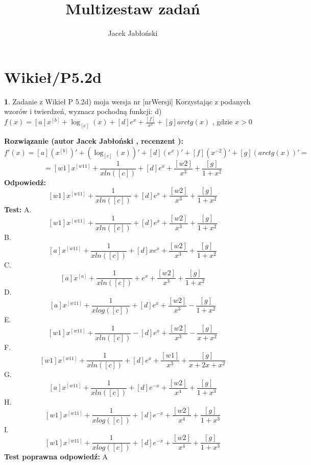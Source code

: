 \documentclass[12pt, a4paper]{article}
\title{Multizestaw zadań}
\author{Jacek Jabłoński}
\date{}
\theoremstyle{definition} %
\newtheorem{zad}{}
\newcommand{\kategoria}[1]{\section{#1}} %
\newcommand{\zadStart}[1]{\begin{zad}#1\newline} %
\newcommand{\zadStop}{\end{zad}}   %
\newcommand{\rozwStart}[2]{\noindent \textbf{Rozwiązanie (autor #1 , recenzent #2): }\newline} %
\newcommand{\rozwStop}{\newline}                                            %
\newcommand{\odpStart}{\noindent \textbf{Odpowiedź:}\newline}    %
\newcommand{\odpStop}{\newline}                                             %
\newcommand{\testStart}{\noindent \textbf{Test:}\newline} %
\newcommand{\testStop}{\newline} %
\newcommand{\kluczStart}{\noindent \textbf{Test poprawna odpowiedź:}\newline} %
\newcommand{\kluczStop}{\newline} %
\begin{document}
\maketitle


\kategoria{Wikieł/P5.2d}
\zadStart{Zadanie z Wikieł P 5.2d) moja wersja nr [nrWersji]}
Korzystając z podanych wzorów i twierdzeń, wyznacz pochodną funkcji:
d) $f(x)=[a]x^{[b]} + \log_{[c]}(x) + [d]e^x + \frac{[f]}{x^2} + [g]arctg(x)$ , gdzie $x>0$
\zadStop
\rozwStart{Jacek Jabłoński}{}
$$f'(x)=[a](x^{[b]})' + (\log_{[c]}(x))' + [d](e^x)' + [f](x^{-2})' + [g](arctg(x))' =$$
$$= [w1]x^{[w11]} + \frac{1}{x ln([c])} +[d] e^x + \frac{[w2]}{x^3} + \frac{[g]}{1+x^2}$$
\rozwStop
\odpStart
$$[w1]x^{[w11]} + \frac{1}{x ln([c])} +[d] e^x + \frac{[w2]}{x^3} + \frac{[g]}{1+x^2}$$
\odpStop
\testStart
A. $$[w1]x^{[w11]} + \frac{1}{x ln([c])} +[d] e^x + \frac{[w2]}{x^3} + \frac{[g]}{1+x^2}$$
B. $$[a]x^{[w11]} + \frac{1}{x ln([c])}+[d]x e^x + \frac{[w2]}{x^3} + \frac{[g]}{1+x^2}$$
C. $$[a]x^{[a]} + \frac{1}{x ln([c])} +e^x + \frac{[w2]}{x^3} + \frac{[g]}{1+x^2}$$
D. $$[a]x^{[w11]} + \frac{1}{x log([c])} +[d] e^x + \frac{[w2]}{x^3} - \frac{[g]}{1+x^2}$$
E. $$[w1]x^{[w11]} + \frac{1}{x ln([c])} -[d] e^x + \frac{[w2]}{x^3} - \frac{[g]}{x+x^2}$$
F. $$[w1]x^{[w11]} + \frac{1}{x ln([c])} +[d] e^x + \frac{[w1]}{x^3} + \frac{[g]}{x+2x+x^2}$$
G. $$[a]x^{[w11]} + \frac{1}{x ln([c])} +[d] e^{-x} + \frac{[w2]}{x^4} + \frac{[g]}{1+x^3}$$
H. $$[w1]x^{[w11]} + \frac{1}{x log([c])} +[d] e^{-x} + \frac{[w2]}{x^4} + \frac{[g]}{1+x^3}$$
I. $$[w1]x^{[w11]} + \frac{1}{x log([c])} +[d] e^{-x} + \frac{[w2]}{x^4} + \frac{[g]}{1+x^3}$$
\testStop
\kluczStart
A
\kluczStop
\end{document}
